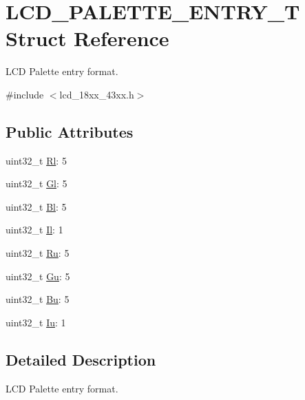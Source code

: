 \hypertarget{struct_l_c_d___p_a_l_e_t_t_e___e_n_t_r_y___t}{}\section{L\+C\+D\+\_\+\+P\+A\+L\+E\+T\+T\+E\+\_\+\+E\+N\+T\+R\+Y\+\_\+T Struct Reference}
\label{struct_l_c_d___p_a_l_e_t_t_e___e_n_t_r_y___t}


L\+CD Palette entry format.  




{\ttfamily \#include $<$lcd\+\_\+18xx\+\_\+43xx.\+h$>$}

\subsection*{Public Attributes}
\begin{DoxyCompactItemize}
\item 
uint32\+\_\+t \hyperlink{struct_l_c_d___p_a_l_e_t_t_e___e_n_t_r_y___t_a7879af6ecfa5cc741d33ba1eb09dc1ce}{Rl}\+: 5
\item 
uint32\+\_\+t \hyperlink{struct_l_c_d___p_a_l_e_t_t_e___e_n_t_r_y___t_a02eab97f11d1f48a1fc65e34c092f455}{Gl}\+: 5
\item 
uint32\+\_\+t \hyperlink{struct_l_c_d___p_a_l_e_t_t_e___e_n_t_r_y___t_a24f8752ac1189e2baa643fe364fc762f}{Bl}\+: 5
\item 
uint32\+\_\+t \hyperlink{struct_l_c_d___p_a_l_e_t_t_e___e_n_t_r_y___t_a964c52f5f2a34bd56d02ae0d66103b3e}{Il}\+: 1
\item 
uint32\+\_\+t \hyperlink{struct_l_c_d___p_a_l_e_t_t_e___e_n_t_r_y___t_a0677c2826c682286016770d1dd41f677}{Ru}\+: 5
\item 
uint32\+\_\+t \hyperlink{struct_l_c_d___p_a_l_e_t_t_e___e_n_t_r_y___t_ae8025da5ef0acdc52b32a07e028836c5}{Gu}\+: 5
\item 
uint32\+\_\+t \hyperlink{struct_l_c_d___p_a_l_e_t_t_e___e_n_t_r_y___t_aa24251b023f3b760aa03e2daa59eae3e}{Bu}\+: 5
\item 
uint32\+\_\+t \hyperlink{struct_l_c_d___p_a_l_e_t_t_e___e_n_t_r_y___t_ac10c864d37b206bc5469c4dd7e8a6c93}{Iu}\+: 1
\end{DoxyCompactItemize}


\subsection{Detailed Description}
L\+CD Palette entry format. 

